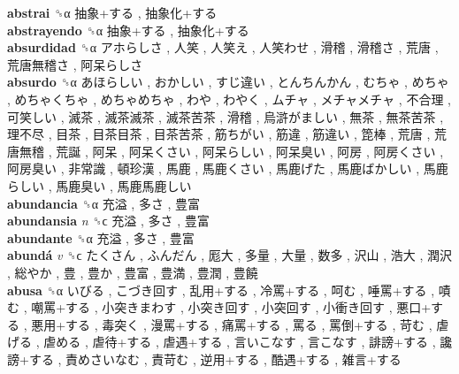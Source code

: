 \textbf{abstrai} ␝α   抽象+する ,  抽象化+する   \\
\textbf{abstrayendo} ␝α   抽象+する ,  抽象化+する   \\
\textbf{absurdidad} ␝α   アホらしさ ,  人笑 ,  人笑え ,  人笑わせ ,  滑稽 ,  滑稽さ ,  荒唐 ,  荒唐無稽さ ,  阿呆らしさ   \\
\textbf{absurdo} ␝α   あほらしい ,  おかしい ,  すじ違い ,  とんちんかん ,  むちゃ ,  めちゃ ,  めちゃくちゃ ,  めちゃめちゃ ,  わや ,  わやく ,  ムチャ ,  メチャメチャ ,  不合理 ,  可笑しい ,  滅茶 ,  滅茶滅茶 ,  滅茶苦茶 ,  滑稽 ,  烏滸がましい ,  無茶 ,  無茶苦茶 ,  理不尽 ,  目茶 ,  目茶目茶 ,  目茶苦茶 ,  筋ちがい ,  筋違 ,  筋違い ,  箆棒 ,  荒唐 ,  荒唐無稽 ,  荒誕 ,  阿呆 ,  阿呆くさい ,  阿呆らしい ,  阿呆臭い ,  阿房 ,  阿房くさい ,  阿房臭い ,  非常識 ,  頓珍漢 ,  馬鹿 ,  馬鹿くさい ,  馬鹿げた ,  馬鹿ばかしい ,  馬鹿らしい ,  馬鹿臭い ,  馬鹿馬鹿しい   \\
\textbf{abundancia} ␝α   充溢 ,  多さ ,  豊富   \\
\textbf{abundansia} \emph{n}  ␝ϲ   充溢 ,  多さ ,  豊富   \\
\textbf{abundante} ␝α   充溢 ,  多さ ,  豊富   \\
\textbf{abundá} \emph{v}  ␝ϲ   たくさん ,  ふんだん ,  厖大 ,  多量 ,  大量 ,  数多 ,  沢山 ,  浩大 ,  潤沢 ,  総やか ,  豊 ,  豊か ,  豊富 ,  豊満 ,  豊潤 ,  豊饒   \\
\textbf{abusa} ␝α   いびる ,  こづき回す ,  乱用+する ,  冷罵+する ,  呵む ,  唾罵+する ,  嘖む ,  嘲罵+する ,  小突きまわす ,  小突き回す ,  小突回す ,  小衝き回す ,  悪口+する ,  悪用+する ,  毒突く ,  漫罵+する ,  痛罵+する ,  罵る ,  罵倒+する ,  苛む ,  虐げる ,  虐める ,  虐待+する ,  虐遇+する ,  言いこなす ,  言こなす ,  誹謗+する ,  讒謗+する ,  責めさいなむ ,  責苛む ,  逆用+する ,  酷遇+する ,  雑言+する   \\
